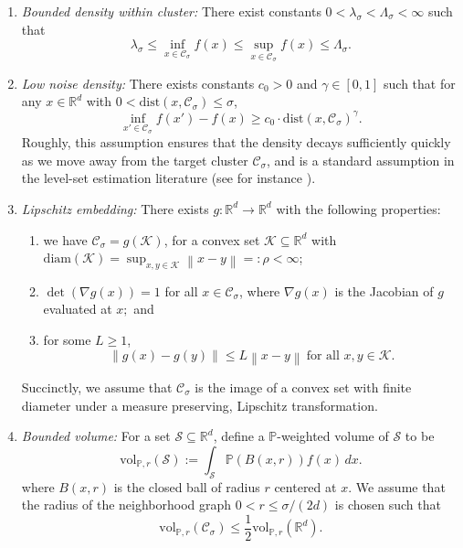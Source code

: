 \documentclass[11pt,twoside]{article}
\theoremstyle{definition}
\newcommand{\diam}{\rho}
\newcommand{\vol}{\mathrm{vol}}
\newcommand{\Reals}{\mathbb{R}}
\newcommand{\Rd}{\Reals^d}
\newcommand{\norm}[1]{\left\lVert#1\right\rVert}
\newcommand{\1}{\mathbbm{1}}
\newcommand{\dist}{\mathrm{dist}}
\newcommand{\Pbb}{\mathbb{P}}
\newcommand{\Cset}{\mathcal{C}}
\newcommand{\Csig}{\Cset_{\sigma}}
\begin{document}
\begin{enumerate}[label=(A\arabic*)]
\item
  \label{asmp: bounded_density}
  \emph{Bounded density within cluster:} There exist constants
  $0<\lambda_{\sigma}< \Lambda_{\sigma}<\infty$ such that 
  $$
  \lambda_{\sigma} \leq \inf_{x \in \Csig} f(x) \leq \sup_{x \in \Csig} f(x)
  \leq \Lambda_{\sigma}.
  $$

\item 
  \label{asmp: low_noise_density}
  \emph{Low noise density:} There exists constants $c_0 > 0$ and $\gamma \in
  [0,1]$ such that for any $x \in \Rd$ with $0 < \dist(x, \Csig) \leq \sigma$,     
  $$
  \inf_{x' \in \Csig} f(x') - f(x) \geq  c_0 \cdot \dist(x, \Csig)^{\gamma}.  
  $$
  Roughly, this assumption ensures that the density decays sufficiently quickly
  as we move away from the target cluster $\Csig$, and is a standard assumption
  in the level-set estimation literature (see for instance \citet{singh2009}).
  
\item
  \label{asmp: embedding}
  \emph{Lipschitz embedding:}
  There exists $g: \Reals^d \to \Reals^d$ with the following properties: 
  \begin{enumerate}
  \item we have $\Csig = g(\mathcal{K})$, for a convex set $\mathcal{K}
    \subseteq \Rd$ with $\mathrm{diam}(\mathcal{K}) = \sup_{x,y \in
      \mathcal{K}}\norm{x - y} =: \diam < \infty$;
  \item $\det(\nabla g (x)) = 1$ for all $x \in \Csig$, where $\nabla g(x)$ is
    the Jacobian of $g$ evaluated at $x;$ and 
  \item for some $L \geq 1$,   
    $$
    \norm{g(x) - g(y)} \leq L \norm{x - y} ~
    \text{for all $x,y \in \mathcal{K}$}. 
    $$
  \end{enumerate}
  Succinctly, we assume that $\Csig$ is the image of a convex set with finite
  diameter under a measure preserving, Lipschitz transformation. 

\item
  \label{asmp: bounded_volume}
  \emph{Bounded volume:}
  For a set $\mathcal{S} \subseteq \Reals^d$, define a $\Pbb$-weighted volume of 
  $\mathcal{S}$ to be  
  \begin{equation}
  \label{eqn:volume}
  \vol_{\Pbb,r}(\mathcal{S}) := \int_{\mathcal{S}} \Pbb(B(x,r)) f(x) \, dx.
  \end{equation}
  where $B(x,r)$ is the closed ball of radius $r$ centered at $x$. We assume
  that the radius of the neighborhood graph $0 < r \leq \sigma/(2d)$ is chosen 
  such that  
  $$
  \vol_{\Pbb,r}(\Cset_\sigma) \leq \frac{1}{2} \vol_{\Pbb,r}(\Reals^d). 
  $$
\end{enumerate}
\end{document}
